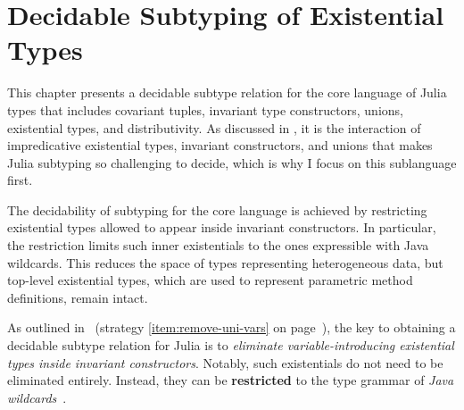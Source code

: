 \chapter{Decidable Subtyping of Existential Types}%
\label{chap:dec-sub}

This chapter presents a decidable subtype relation for the core language
of Julia types that includes covariant tuples, invariant type constructors,
unions, existential types, and distributivity.
As discussed in , it is the interaction of
impredicative existential types, invariant constructors, and unions that makes
Julia subtyping so challenging to decide, which is why I focus
on this sublanguage first.

The decidability of subtyping for the core language is achieved by
restricting existential types allowed to appear inside invariant 
constructors. In particular, the restriction limits such inner existentials 
to the ones expressible with Java wildcards.
This reduces the space of types representing heterogeneous data,
but top-level existential types, which are used to represent parametric method
definitions, remain intact.



As outlined in~
(strategy \ref{item:remove-uni-vars} on page~\pageref{item:remove-uni-vars}),
the key to obtaining a decidable subtype relation for Julia is to
\emph{eliminate variable-introducing existential types inside invariant
constructors}. Notably, such existentials do not need to be eliminated
entirely. Instead, they can be \textbf{restricted} to the type grammar
of \emph{Java wildcards}~\cite{bib:torgersen:wildcards:2004}.

